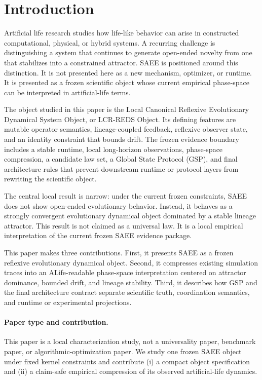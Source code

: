 \section{Introduction}

Artificial life research studies how life-like behavior can arise in
constructed computational, physical, or hybrid systems. A recurring challenge
is distinguishing a system that continues to generate open-ended novelty from
one that stabilizes into a constrained attractor. SAEE is positioned around
this distinction. It is not presented here as a new mechanism, optimizer, or
runtime. It is presented as a frozen scientific object whose current empirical
phase-space can be interpreted in artificial-life terms.

The object studied in this paper is the Local Canonical Reflexive Evolutionary
Dynamical System Object, or LCR-REDS Object. Its defining features are mutable
operator semantics, lineage-coupled feedback, reflexive observer state, and an
identity constraint that bounds drift. The frozen evidence boundary includes a
stable runtime, local long-horizon observations, phase-space compression, a
candidate law set, a Global State Protocol (GSP), and final architecture rules
that prevent downstream runtime or protocol layers from rewriting the
scientific object.

The central local result is narrow: under the current frozen constraints, SAEE
does not show open-ended evolutionary behavior. Instead, it behaves as a
strongly convergent evolutionary dynamical object dominated by a stable lineage
attractor. This result is not claimed as a universal law. It is a local
empirical interpretation of the current frozen SAEE evidence package.

This paper makes three contributions. First, it presents SAEE as a frozen
reflexive evolutionary dynamical object. Second, it compresses existing
simulation traces into an ALife-readable phase-space interpretation centered
on attractor dominance, bounded drift, and lineage stability. Third, it
describes how GSP and the final architecture contract separate scientific
truth, coordination semantics, and runtime or experimental projections.

\paragraph{Paper type and contribution.}
This paper is a local characterization study, not a universality paper,
benchmark paper, or algorithmic-optimization paper. We study one frozen SAEE
object under fixed kernel constraints and contribute (i) a compact object
specification and (ii) a claim-safe empirical compression of its observed
artificial-life dynamics.
